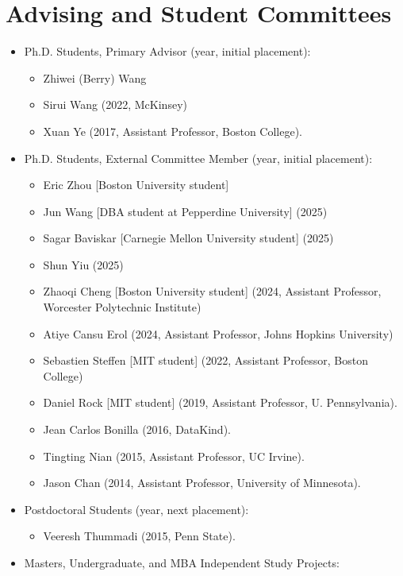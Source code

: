 \documentclass[10pt,letterpaper]{article}
\begin{document}
\section*{Advising and Student Committees}

\begin{itemize}
\item Ph.D. Students, Primary Advisor (year, initial placement):
  \begin{itemize}
    \item Zhiwei (Berry) Wang
    \item Sirui Wang (2022, McKinsey)
    \item Xuan Ye (2017, Assistant Professor, Boston College).
    \end{itemize} 
\item Ph.D. Students, External Committee Member (year, initial placement):
  \begin{itemize}
  \item Eric Zhou [Boston University student]
  \item Jun Wang [DBA student at Pepperdine University] (2025)
  \item Sagar Baviskar [Carnegie Mellon University student] (2025)
  \item Shun Yiu (2025)
  \item Zhaoqi Cheng [Boston University student] (2024, Assistant Professor, Worcester Polytechnic Institute)
  \item Atiye Cansu Erol (2024, Assistant Professor, Johns Hopkins University)
  \item Sebastien Steffen [MIT student] (2022, Assistant Professor, Boston College)
  \item Daniel Rock [MIT student] (2019, Assistant Professor, U. Pennsylvania).
  \item Jean Carlos Bonilla (2016, DataKind).
  \item Tingting Nian (2015, Assistant Professor, UC Irvine).
  \item Jason Chan (2014, Assistant Professor, University of Minnesota).
  \end{itemize}
\item Postdoctoral Students (year, next placement):
  \begin{itemize}
  \item Veeresh Thummadi (2015, Penn State).
  \end{itemize}
\item Masters, Undergraduate, and MBA Independent Study Projects:
  \begin{itemize}

\end{itemize}
\end{itemize}
\end{document}
